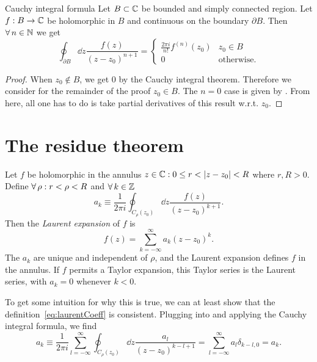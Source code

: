 \begin{theorem}{Cauchy integral formula}{}
Let $B\subset\mathbb{C}$ be bounded and simply connected region. Let $f:B\to\mathbb{C}$ be
holomorphic in $B$ and continuous on the boundary $\partial B$.
Then $\operatorname{\forall} n\in\mathbb{N}$ we get
$$
  \oint_{\partial B}\dd{z}\frac{f(z)}{(z-z_0)^{n+1}}=
\begin{cases}
\frac{2\pi i}{n!}f^{(n)}(z_0) & z_0\in B \\
 0            & \text{otherwise}.
\end{cases}
$$
\begin{proof} When $z_0\notin B$, we get 0 by the Cauchy integral theorem.
Therefore we consider for the remainder of the proof $z_0\in B$.
The $n=0$ case is given by . 
From here, all one has to do is take partial derivatives of this result 
w.r.t. $z_0$.
\end{proof} 
\end{theorem}

\section{The residue theorem}\label{sec:residueThm}

Let $f$ be holomorphic in the annulus ${z\in\C : 0\leq r<|z-z_0|<R}$
where $r,R>0$.
Define $\operatorname{\forall}\rho : r<\rho<R$ and $\operatorname{\forall} k\in\mathbb{Z}$
\begin{equation}\label{eq:laurentCoeff}
  a_k\equiv\frac{1}{2\pi i}\oint_{C_{\rho}(z_0)}\dd{z}\frac{f(z)}{(z-z_0)^{k+1}}.
\end{equation}
Then the {\it Laurent expansion} of $f$ is
\begin{equation}\label{eq:laurentExpansion}
  f(z)=\sum_{k=-\infty}^\infty a_k(z-z_0)^k.
\end{equation}
The $a_k$ are unique and independent of $\rho$, and the Laurent expansion
defines $f$ in the annulus.
If $f$ permits a Taylor expansion, this Taylor series is the Laurent
series, with $a_k=0$ whenever $k<0$.

To get some intuition for why this is true, we can at least show that the
definition~\eqref{eq:laurentCoeff} is consistent.
Plugging  into 
and applying the Cauchy integral formula, we find
\begin{equation}
  a_k\equiv\frac{1}{2\pi i}\sum_{l=-\infty}^\infty\oint_{C_{\rho}(z_0)}
  \dd{z}\frac{a_l}{(z-z_0)^{k-l+1}}
     = \sum_{l=-\infty}^\infty a_l\delta_{k-l,0}=a_k.
\end{equation}

